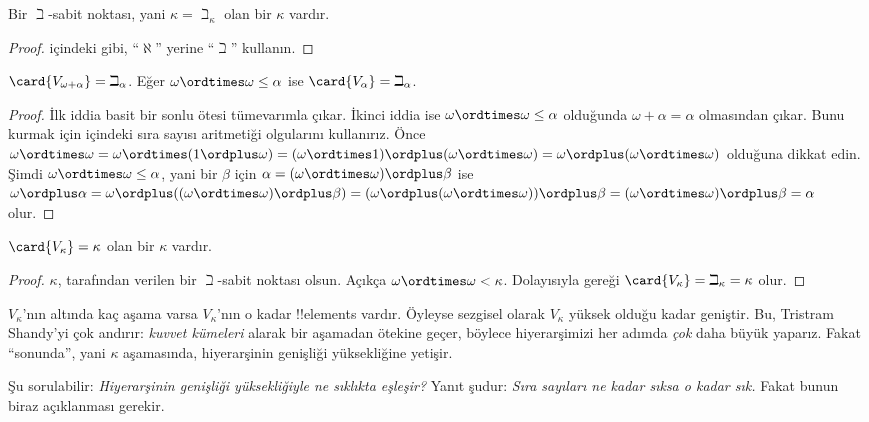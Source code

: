\begin{prop}
Bir $\beth$-sabit noktası, yani $\kappa=\beth_\kappa$ olan bir $\kappa$
vardır.
\end{prop}

\begin{proof}
 içindeki gibi, ``$\aleph$'' yerine ``$\beth$''
kullanın.
\end{proof}

\begin{prop}
$\card{V_{\omega+\alpha}}=\beth_\alpha$. Eğer
$\omega\ordtimes\omega\leq\alpha$ ise
$\card{V_\alpha}=\beth_\alpha$.
\end{prop}

\begin{proof}
İlk iddia basit bir sonlu ötesi tümevarımla çıkar. İkinci iddia ise
$\omega\ordtimes\omega\leq\alpha$ olduğunda
$\omega+\alpha=\alpha$ olmasından çıkar. Bunu kurmak için
 içindeki sıra sayısı aritmetiği olgularını
kullanırız. Önce
$\omega\ordtimes\omega=\omega\ordtimes(1\ordplus\omega)=
(\omega\ordtimes1)\ordplus(\omega\ordtimes\omega)=
\omega\ordplus(\omega\ordtimes\omega)$ olduğuna dikkat edin. Şimdi
$\omega\ordtimes\omega\leq\alpha$, yani bir $\beta$ için
$\alpha=(\omega\ordtimes\omega)\ordplus\beta$ ise
$\omega\ordplus\alpha=\omega\ordplus
((\omega\ordtimes\omega)\ordplus\beta)=
(\omega\ordplus(\omega\ordtimes\omega))\ordplus\beta=
(\omega\ordtimes\omega)\ordplus\beta=\alpha$ olur.
\end{proof}

\begin{cor}
$\card{V_\kappa}=\kappa$ olan bir $\kappa$ vardır.
\end{cor}

\begin{proof}
$\kappa$,  tarafından verilen bir $\beth$-sabit noktası
olsun. Açıkça $\omega\ordtimes\omega<\kappa$. Dolayısıyla
 gereği
$\card{V_\kappa}=\beth_\kappa=\kappa$ olur.
\end{proof}

$V_\kappa$'nın altında kaç aşama varsa $V_\kappa$'nın o kadar
!!{element}s vardır. Öyleyse sezgisel olarak $V_\kappa$ yüksek olduğu kadar
geniştir. Bu, Tristram Shandy'yi çok andırır: \emph{kuvvet kümeleri} alarak bir
aşamadan ötekine geçer, böylece hiyerarşimizi her adımda \emph{çok} daha
büyük yaparız. Fakat ``sonunda'', yani $\kappa$ aşamasında, hiyerarşinin
genişliği yüksekliğine yetişir.

Şu sorulabilir: \emph{Hiyerarşinin genişliği yüksekliğiyle ne sıklıkta
eşleşir?} Yanıt şudur: \emph{Sıra sayıları ne kadar sıksa o kadar sık.}
Fakat bunun biraz açıklanması gerekir.

